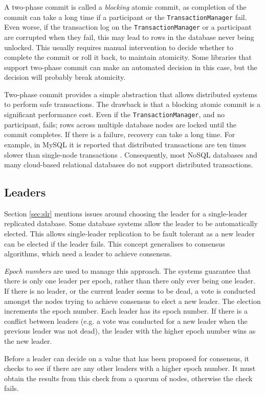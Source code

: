 A two-phase commit is called a \emph{blocking} atomic commit,
as completion of the commit can take a long time if a participant or the \texttt{TransactionManager} fail.
Even worse, if the transaction log on the \texttt{Transaction\-Manager} or a participant are corrupted when they fail,
this may lead to rows in the database never being unlocked.
This usually requires manual intervention to decide whether to complete the commit or roll it back, to maintain atomicity.
Some libraries that support two-phase commit can make an automated decision in this case,
but the decision will probably break atomicity.

Two-phase commit provides a simple abstraction that allows distributed systems to perform safe transactions.
The drawback is that a blocking atomic commit is a significant performance cost.
Even if the \texttt{TransactionManager}, and no participant, fails;
rows across multiple database nodes are locked until the commit completes.
If there is a failure, recovery can take a long time.
For example, in MySQL it is reported that distributed transactions are ten times slower than single-node transactions \cite{distrib-mysql}.
Consequently, most NoSQL databases and many cloud-based relational databases do not support distributed transactions.

\subsection{Leaders}

Section \ref{sec:slr} mentions issues around choosing the leader for a single-leader replicated database.
Some database systems allow the leader to be automatically elected.
This allows single-leader replication to be fault tolerant as a new leader can be elected if the leader fails.
This concept generalises to consensus algorithms, which need a leader to achieve consensus.

\emph{Epoch numbers} are used to manage this approach.
The systems guarantee that there is only one leader per epoch, rather than there only ever being one leader.
If there is no leader, or the current leader seems to be dead,
a vote is conducted amongst the nodes trying to achieve consensus to elect a new leader.
The election increments the epoch number.
Each leader has its epoch number.
If there is a conflict between leaders (e.g. a vote was conducted for a new leader when the previous leader was not dead),
the leader with the higher epoch number wins as the new leader.

Before a leader can decide on a value that has been proposed for consensus,
it checks to see if there are any other leaders with a higher epoch number.
It must obtain the results from this check from a quorum of nodes,
otherwise the check fails.


